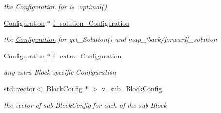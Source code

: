 \begin{DoxyCompactItemize}
\begin{DoxyCompactList}\small\item\em the \mbox{\hyperlink{class_s_m_spp__di__unipi__it_1_1_configuration}{Configuration}} for is\+\_\+optimal() \end{DoxyCompactList}\item 
\mbox{\label{class_s_m_spp__di__unipi__it_1_1_block_config_a23bb76c295c057cfbc5213cb971bbc71}} 
\mbox{\hyperlink{class_s_m_spp__di__unipi__it_1_1_configuration}{Configuration}} $\ast$ \mbox{\hyperlink{class_s_m_spp__di__unipi__it_1_1_block_config_a23bb76c295c057cfbc5213cb971bbc71}{f\+\_\+solution\+\_\+\+Configuration}}
\begin{DoxyCompactList}\small\item\em the \mbox{\hyperlink{class_s_m_spp__di__unipi__it_1_1_configuration}{Configuration}} for get\+\_\+\+Solution() and map\+\_\+\mbox{[}back/forward\mbox{]}\+\_\+solution \end{DoxyCompactList}\item 
\mbox{\label{class_s_m_spp__di__unipi__it_1_1_block_config_a7d26c4062ec83c8aafe8363a2be49f7c}} 
\mbox{\hyperlink{class_s_m_spp__di__unipi__it_1_1_configuration}{Configuration}} $\ast$ \mbox{\hyperlink{class_s_m_spp__di__unipi__it_1_1_block_config_a7d26c4062ec83c8aafe8363a2be49f7c}{f\+\_\+extra\+\_\+\+Configuration}}
\begin{DoxyCompactList}\small\item\em any extra Block-\/specific \mbox{\hyperlink{class_s_m_spp__di__unipi__it_1_1_configuration}{Configuration}} \end{DoxyCompactList}\item 
\mbox{\label{class_s_m_spp__di__unipi__it_1_1_block_config_a1055951686613145a68824520584ee97}} 
std\+::vector$<$ \mbox{\hyperlink{class_s_m_spp__di__unipi__it_1_1_block_config}{Block\+Config}} $\ast$ $>$ \mbox{\hyperlink{class_s_m_spp__di__unipi__it_1_1_block_config_a1055951686613145a68824520584ee97}{v\+\_\+sub\+\_\+\+Block\+Config}}
\begin{DoxyCompactList}\small\item\em the vector of sub-\/\+Block\+Config for each of the sub-\/\+Block \end{DoxyCompactList}\end{DoxyCompactItemize}
